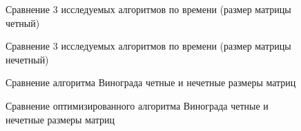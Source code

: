 \begin{figure}[H]
    \caption{Сравнение 3 исследуемых алгоритмов по времени (размер матрицы четный)}
    \label{ris:graph1}
\end{figure}

\begin{figure}[H]
    \caption{Сравнение 3 исследуемых алгоритмов по времени (размер матрицы нечетный)}
    \label{ris:graph2}
\end{figure}

\begin{figure}[H]
    \caption{Сравнение алгоритма Винограда четные и нечетные размеры матриц}
    \label{ris:graph3}
\end{figure}

\begin{figure}[H]
    \caption{Сравнение оптимизированного алгоритма Винограда четные и нечетные размеры матриц}
    \label{ris:graph4}
\end{figure}

